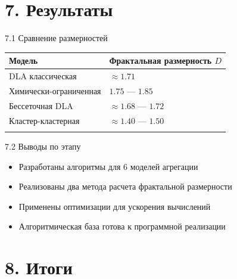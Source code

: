 \documentclass[
  ignorenonframetext,
  aspectratio=169,
  russian,
]{beamer}
\providecommand{\tightlist}{%
  \setlength{\itemsep}{0pt}\setlength{\parskip}{0pt}}
\begin{document}
\section{7. Результаты}\label{ux440ux435ux437ux443ux43bux44cux442ux430ux442ux44b}

\begin{frame}{7.1 Сравнение размерностей}
\label{ux441ux440ux430ux432ux43dux435ux43dux438ux435-ux440ux430ux437ux43cux435ux440ux43dux43eux441ux442ux435ux439}
\begin{longtable}[]{@{}ll@{}}
\toprule\noalign{}
Модель & Фрактальная размерность \(D\) \\
\midrule\noalign{}
\endhead
DLA классическая & \(\approx 1.71\) \\
Химически-ограниченная & \(1.75\) --- \(1.85\) \\
Бессеточная DLA & \(\approx 1.68\) --- \(1.72\) \\
Кластер-кластерная & \(\approx 1.40\) --- \(1.50\) \\
\bottomrule\noalign{}
\end{longtable}
\end{frame}

\begin{frame}{7.2 Выводы по этапу}
\label{ux432ux44bux432ux43eux434ux44b-ux43fux43e-ux44dux442ux430ux43fux443}
\begin{itemize}
\tightlist
\item
  Разработаны алгоритмы для 6 моделей агрегации
\item
  Реализованы два метода расчета фрактальной размерности
\item
  Применены оптимизации для ускорения вычислений
\item
  Алгоритмическая база готова к программной реализации
\end{itemize}
\end{frame}

\section{8. Итоги}\label{ux438ux442ux43eux433ux438}
\end{document}
